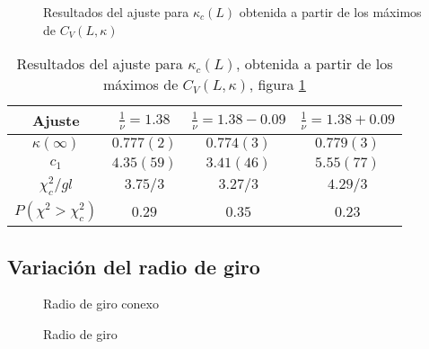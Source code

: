 \begin{figure}[h]
  \centering
  
  \caption{Resultados del ajuste para $\kappa_c(L)$ obtenida a partir de los
  máximos de $C_V(L,\kappa)$}\label{kappa_Cv_fig}
\end{figure}

\begin{table}[h]
\centering
\begin{tabular}{|c|c|c|c|}\hline
 Ajuste              & $\frac{1}{\nu}=1.38$ & $\frac{1}{\nu}=1.38-0.09$& $\frac{1}{\nu}=1.38+0.09$ \\ \hline\hline
 $\kappa(\infty)$   & $0.777(2) $          &  $0.774(3)$              &  $0.779(3)$   \\ \hline
 $c_1$              & $4.35(59)$           &  $3.41(46)$              &   $5.55(77)$  \\ \hline
 $\chi_c^2/gl$       &  $3.75/3$            &  $3.27/3$                & $4.29/3$  \\ \hline
 $P(\chi^2>\chi_c^2)$&  $0.29$              &  $0.35$                  &   $0.23$ \\ \hline
\end{tabular}
\caption{Resultados del ajuste para $\kappa_c(L)$, obtenida a partir de los
  máximos de $C_V(L,\kappa)$, figura \ref{kappa_Cv_fig}}\label{kappa_Cv_tab}
\end{table}
\clearpage

\subsection{Variación del radio de giro}

\begin{figure}[h]
  \centering
  
  \caption{Radio de giro conexo}
\end{figure}

\begin{figure}[h]
  \centering
  
  \caption{Radio de giro}
\end{figure}

